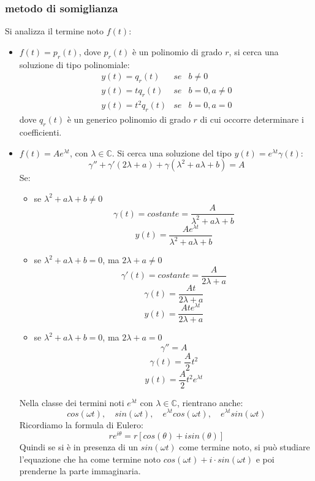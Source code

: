 \subsubsection{metodo di somiglianza}
Si analizza il termine noto $f(t)$:
\begin{itemize}
    \item $f(t) = p_r(t)$, dove $p_r(t)$ è un polinomio di grado $r$, si cerca una soluzione di tipo polinomiale:
    \[
        \begin{matrix}
            y(t) = q_r(t)  &se &b\neq0\\
            y(t) = tq_r(t) &se &b=0, a\neq 0\\
            y(t)=t^2q_r(t) &se &b=0, a=0
        \end{matrix}
    \]
    dove $q_r(t)$ è un generico polinomio di grado $r$ di cui occorre determinare i coefficienti.
    \item $f(t) = Ae^{\lambda t}$, con $\lambda \in \mathbb{C}$. Si cerca una soluzione del tipo $y(t) = e^{\lambda t}\gamma(t)$:
    \[
        \gamma'' + \gamma'(2 \lambda + a) + \gamma (\lambda^2 + a \lambda + b) = A
    \]
    Se:
    \begin{itemize}
        \item se $\lambda^2 + a \lambda + b \neq 0$
        \[
            \gamma(t) = costante = \frac{A}{\lambda^2 + a \lambda + b}
        \]
        \[
            y(t) =\frac{Ae^{\lambda t}}{\lambda^2 + a \lambda + b}
        \]
        \item se $\lambda^2 + a \lambda + b = 0$, ma $2 \lambda + a \neq 0$
        \[
            \gamma'(t) = costante = \frac{A}{2 \lambda + a}
        \]
        \[
            \gamma(t) = \frac{At}{2 \lambda + a}
        \]
        \[
            y(t) = \frac{At e^{\lambda t}}{2 \lambda + a}
        \]
        \item se $\lambda^2 + a \lambda + b = 0$, ma $2 \lambda + a = 0$
        \[
            \gamma''= A
        \]
        \[
            \gamma(t) = \frac{A}{2}t^2
        \]
        \[
            y(t) = \frac{A}{2}t^2e^{\lambda t}
        \]
    \end{itemize}
    Nella classe dei termini noti $e^{\lambda t}$ con $\lambda \in \mathbb{C}$, rientrano anche:
    \[
        cos(\omega t), \quad sin(\omega t), \quad e^{\lambda t}cos(\omega t), \quad e^{\lambda t}sin(\omega t)
    \]
    Ricordiamo la formula di Eulero:
    \[
        re^{i \theta} =r[cos(\theta) + i sin(\theta)]
    \]
    Quindi se si è in presenza di un $sin(\omega t)$ come termine noto, si può studiare l'equazione che ha come termine noto $cos(\omega t) + i \cdot sin(\omega t)$ e poi prenderne la parte immaginaria.\newline

\end{itemize}
